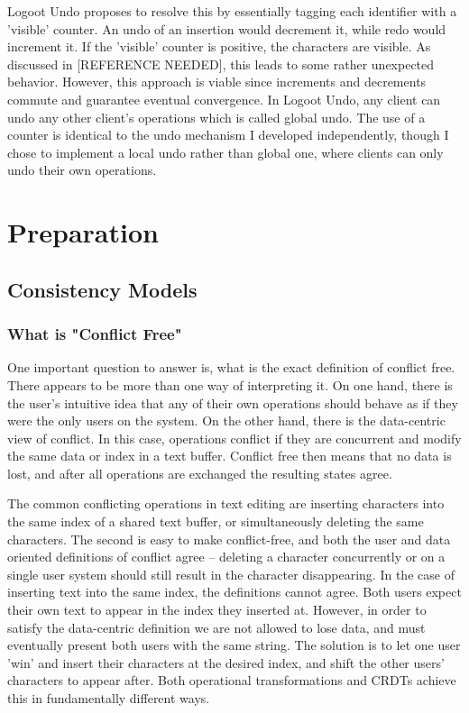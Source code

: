 \documentclass[12pt,a4paper,twoside,openright]{report}
\begin{document}
Logoot Undo \cite{weiss2010undo} proposes to resolve this by essentially tagging each identifier with a 'visible' counter. An undo of an insertion would decrement it, while redo would increment it. If the 'visible' counter is positive, the characters are visible. As discussed in [REFERENCE NEEDED], this leads to some rather unexpected behavior. However, this approach is viable since increments and decrements commute and guarantee eventual convergence. In Logoot Undo, any client can undo any other client's operations which is called global undo. The use of a counter is identical to the undo mechanism I developed independently, though I chose to implement a local undo rather than global one, where clients can only undo their own operations.


\chapter{Preparation}


\section{Consistency Models}

	\subsection{What is "Conflict Free"}
	
	One important question to answer is, what is the exact definition of conflict free. There appears to be more than one way of interpreting it. On one hand, there is the user's intuitive idea that any of their own operations should behave as if they were the only users on the system. On the other hand, there is the data-centric view of conflict. In this case, operations conflict if they are concurrent and modify the same data or index in a text buffer. Conflict free then means that no data is lost, and after all operations are exchanged the resulting states agree.
	
	The common conflicting operations in text editing are inserting characters into the same index of a shared text buffer, or simultaneously deleting the same characters. The second is easy to make conflict-free, and both the user and data oriented definitions of conflict agree -- deleting a character concurrently or on a single user system should still result in the character disappearing. In the case of inserting text into the same index, the definitions cannot agree. Both users expect their own text to appear in the index they inserted at. However, in order to satisfy the data-centric definition we are not allowed to lose data, and must eventually present both users with the same string. The solution is to let one user 'win' and insert their characters at the desired index, and shift the other users' characters to appear after. Both operational transformations and CRDTs achieve this in fundamentally different ways.
	
\end{document}
